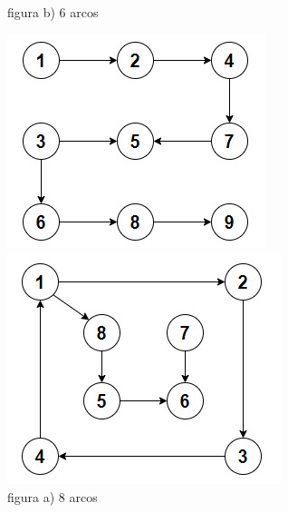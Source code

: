 \documentclass{report}
\begin{document}
\begin{enumerate}[2.1]
\begin{enumerate}[(a)]
\begin{figure}[ht]
\begin{minipage}[b]{0.4\linewidth}
            \caption{figura b) 6 arcos}
            \label{fig:figura2}
            \end{minipage}
        \end{figure}
        \begin{figure}[ht]
            \begin{minipage}[b]{0.4\linewidth}
            \centering
            \includegraphics[width=\linewidth]{2.1incisoc8arcosfiguraa.jpeg}
            \caption{figura a) 8 arcos}
            \label{8 arcos 1}
            \end{minipage}
            \hspace{0.5cm}
            \begin{minipage}[b]{0.4\linewidth}
            \centering
            \includegraphics[width=\linewidth]{2.1incisoc8arcosfigurab.jpeg}

\end{minipage}
\end{figure}
\end{enumerate}
\end{enumerate}
\end{document}

